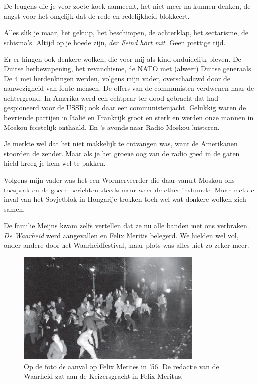\documentclass[12pt,twoside, openright]{memoir}
\begin{document}
De leugens die je voor zoete koek aanneemt, het niet meer na kunnen denken, de angst voor het ongelijk dat de rede en redelijkheid blokkeert. 

Alles slik je maar, het gekuip, het beschimpen, de achterklap, het sectarisme, de schisma's. Altijd op je hoede zijn, \emph{der Feind hört mit}. Geen prettige tijd. 

Er er hingen ook donkere wolken, die voor mij als kind onduidelijk bleven. De Duitse herbewapening, het revanchisme, de NATO met (alweer) Duitse generaals. De 4 mei herdenkingen werden, volgens mijn vader, overschaduwd door de aanwezigheid van foute mensen. De offers van de communisten verdwenen naar de achtergrond. In Amerika werd een echtpaar ter dood gebracht dat had gespioneerd voor de USSR; ook daar een communistenjacht. Gelukkig waren de bevriende partijen in Italië en Frankrijk groot en sterk en werden onze mannen in Moskou feestelijk onthaald. En ’s avonds naar Radio Moskou luisteren. 

Je merkte wel dat het niet makkelijk te ontvangen was, want de Amerikanen stoorden de zender. Maar als je het groene oog van de radio goed in de gaten hield kreeg je hem wel te pakken. 

Volgens mijn vader was het een Wormerveerder die daar vanuit Moskou ons toesprak en de goede berichten steeds maar weer de ether instuurde. Maar met de inval van het Sovjetblok in Hongarije trokken toch wel wat donkere wolken zich samen. 

De familie Meijns kwam zelfs vertellen dat ze nu alle banden met ons verbraken. \emph{De Waarheid} werd aangevallen en Felix Meritis belegerd. We hielden wel vol, onder andere door het Waarheidfestival, maar plots was alles niet zo zeker meer.

\begin{figure}
\centering
\includegraphics[width=0.8\textwidth]{img/ch17/Felix_Meritis1}
\caption*{\footnotesize Op de foto de aanval op Felix Merites in ’56. De redactie van de Waarheid zat aan de Keizersgracht in Felix Meritus.}
\end{figure}
\end{document}
